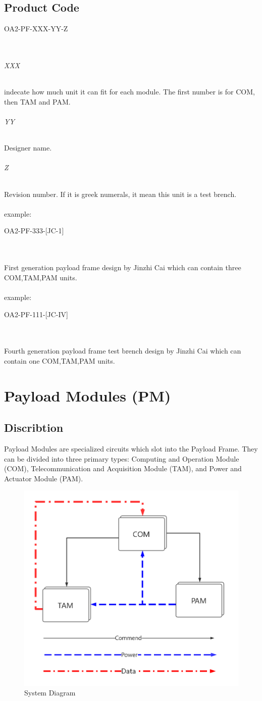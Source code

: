 \documentclass[12pt,article]{memoir}
\begin{document}
\section{Product Code}
\begin{LARGE}
OA2-PF-XXX-YY-Z
\end{LARGE}\\
\subparagraph{XXX}
indecate how much unit it can fit for each module. The first number is for COM, then TAM and PAM.
\subparagraph{YY}
Designer name.
\subparagraph{Z}
Revision number. If it is greek numerals, it mean this unit is a test brench.
\\\\
example: 
\begin{large}
OA2-PF-333-[JC-1]
\end{large}\\\\
First generation payload frame design by Jinzhi Cai which can contain three COM,TAM,PAM units.\\\\
example: 
\begin{large}
OA2-PF-111-[JC-IV]
\end{large}\\\\
Fourth generation payload frame test brench design by Jinzhi Cai which can contain one COM,TAM,PAM units.
\newpage
\chapter{Payload Modules (PM)}
\section{Discribtion}
Payload Modules are specialized circuits which slot into the Payload Frame. They can be divided into three primary types: Computing and Operation Module (COM), Telecommunication and Acquisition Module (TAM), and Power and Actuator Module (PAM).
\begin{figure}[htp]
\includegraphics[width=\textwidth]{ES00003_Globaldia.png}
 \caption{System Diagram}	
\end{figure}
\clearpage
\end{document}
